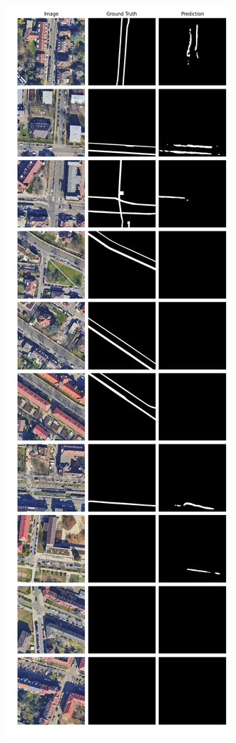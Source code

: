 	
	
	\begin{figure}
	\centering
	\begin{subfigure}{.4\textwidth}
		\centering
		\includegraphics[width=1.\textwidth]{Bilder/Samples-KA/rbunet-r.png} 

\end{subfigure}
\end{figure}
